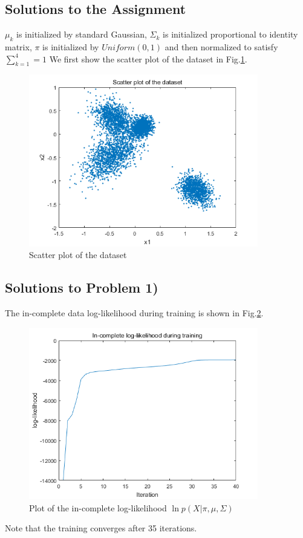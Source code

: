 \documentclass{article}
\begin{document}
\begin{spacing}{1.5}
\section{Solutions to the Assignment}
$\mu_k$ is initialized by standard Gaussian, $\Sigma_k$ is initialized proportional to identity matrix, $\pi$ is initialized by $Uniform(0,1)$ and then normalized to satisfy $\sum_{k=1}^4=1$
We first show the scatter plot of the dataset in Fig.\ref{0}.
\begin{figure}
  \centering
  \includegraphics[width=10cm]{0}
  \caption{Scatter plot of the dataset}\label{0} 
\end{figure}

\subsection{Solutions to Problem 1)}
The in-complete data log-likelihood during training is shown in Fig.\ref{1-1}.
\begin{figure}
  \centering
  \includegraphics[width=10cm]{1-1}
  \caption{Plot of the in-complete log-likelihood $\ln p(X|\pi,\mu,\Sigma)$}\label{1-1} 
\end{figure}
Note that the training converges after 35 iterations.


\end{spacing}
\end{document}

